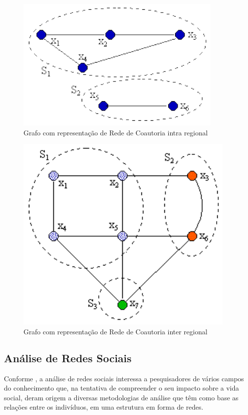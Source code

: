 \documentclass[12pt]{article}
\begin{document}
\begin{figure}[H]
\centering
\includegraphics[scale=0.8]{images/intra-grafo.pdf}
\caption{Grafo com representação de Rede de Coautoria intra regional}
\label{grafo1}
\end{figure}

\begin{figure}[H]
\centering
\includegraphics[scale=0.8]{images/inter-grafo.pdf}
\caption{Grafo com representação de Rede de Coautoria inter regional}
\label{grafo2}
\end{figure}

\subsection{Análise de Redes Sociais}

Conforme \cite{Silva2006}, a análise de redes sociais interessa a pesquisadores de vários campos do conhecimento que, na tentativa de compreender o seu impacto sobre a vida social, deram origem a diversas metodologias de análise que têm como base as relações entre os indivíduos, em uma estrutura em forma de redes.
\end{document}
